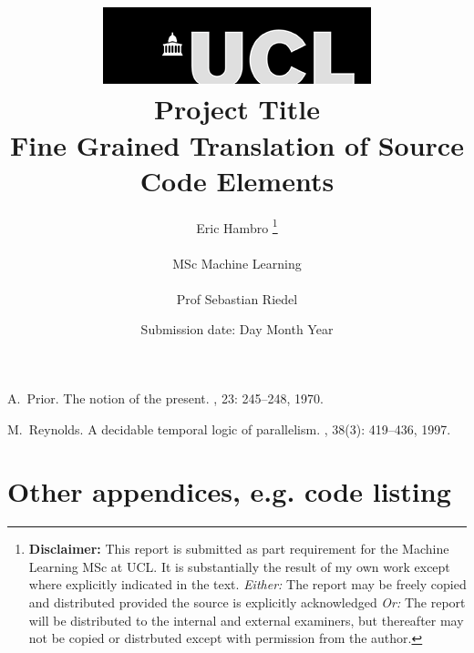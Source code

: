 \documentclass[12pt]{report}
\title{     
    { \includegraphics[scale=.5]{ucl_logo.png} \\}
    { \Huge Project Title  \\ }
    { \large Fine Grained Translation of Source Code Elements \\}
}
\date{Submission date: Day Month Year}
\author{
    Eric Hambro
    \thanks{ 
        {\bf Disclaimer:}
        This report is submitted as part requirement for the Machine Learning MSc at UCL. 
        It is substantially the result of my own work except where explicitly indicated in the text.
        \emph{Either:} The report may be freely copied and distributed provided the source is explicitly acknowledged
        \newline  %
        \emph{Or:}\newline
        The report will be distributed to the internal and external examiners, but thereafter may not be copied or distrbuted except with permission from the author.
    }
    \\ \\
    MSc Machine Learning\\ \\
    Prof Sebastian Riedel
}
\begin{document}










% 


\appendix
 
 


 
  






\begin{thebibliography}{HHM99}


A.~Prior.
\newblock The notion of the present.
, 23:  245--248, 1970.


M.~Reynolds.
\newblock A decidable temporal logic of parallelism.
, 38(3):  419--436,
  1997.
\end{thebibliography}
\chapter{Other appendices, e.g. code listing}
\end{document}
